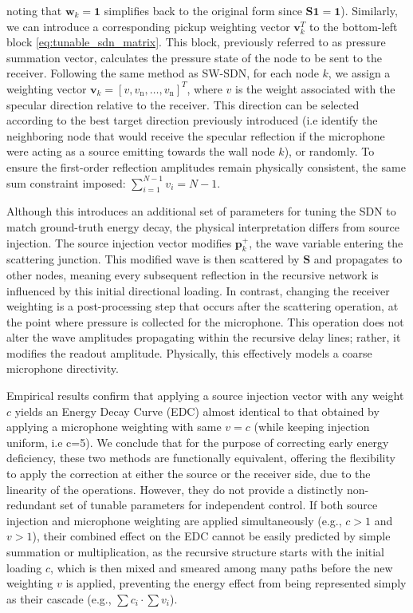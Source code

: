 \documentclass[conference]{IEEEtran}
\begin{document}
noting that $\mathbf{w}_k = \mathbf{1}$ simplifies back to the original form since $\mathbf{S}\mathbf{1} = \mathbf{1}$). Similarly, we can introduce a corresponding pickup weighting vector $\mathbf{v}_k^T$ to the bottom-left block \eqref{eq:tunable_sdn_matrix}. This block, previously referred to as pressure summation vector, calculates the pressure state of the node to be sent to the receiver. Following the same method as SW-SDN, for each node $k$, we assign a weighting vector $\mathbf{v}_k = [v, v_{\text{n}}, \ldots ,v_{\text{n}}]^T$, where $v$ is the weight associated with the specular direction relative to the receiver. This direction can be selected according to the best target direction previously introduced (i.e identify the neighboring node that would receive the specular reflection if the microphone were acting as a source emitting towards the wall node $k$), or randomly. To ensure the first-order reflection amplitudes remain physically consistent, the same sum constraint imposed: $\sum_{i=1}^{N-1} v_i = N-1$.

Although this introduces an additional set of parameters for tuning the SDN to match ground-truth energy decay, the physical interpretation differs from source injection. The source injection vector modifies $\mathbf{p}_k^+$, the wave variable entering the scattering junction. This modified wave is then scattered by $\mathbf{S}$ and propagates to other nodes, meaning every subsequent reflection in the recursive network is influenced by this initial directional loading. In contrast, changing the receiver weighting is a post-processing step that occurs after the scattering operation, at the point where pressure is collected for the microphone. This operation does not alter the wave amplitudes propagating within the recursive delay lines; rather, it modifies the readout amplitude. Physically, this effectively models a coarse microphone directivity. 


Empirical results confirm that applying a source injection vector with any weight $c$ yields an Energy Decay Curve (EDC) almost identical to that obtained by applying a microphone weighting with same $v=c$ (while keeping injection uniform, i.e c=5). 
We conclude that for the purpose of correcting early energy deficiency, these two methods are functionally equivalent, offering the flexibility to apply the correction at either the source or the receiver side, due to the linearity of the operations. 
However, they do not provide a distinctly non-redundant set of tunable parameters for independent control. If both source injection and microphone weighting are applied simultaneously (e.g., $c > 1$ and $v > 1$), their combined effect on the EDC cannot be easily predicted by simple summation or multiplication, as the recursive structure starts with the initial loading $c$, which is then mixed and smeared among many paths before the new weighting $v$ is applied, preventing the energy effect from being represented simply as their cascade (e.g., $\sum c_i \cdot \sum v_i$).
\end{document}

